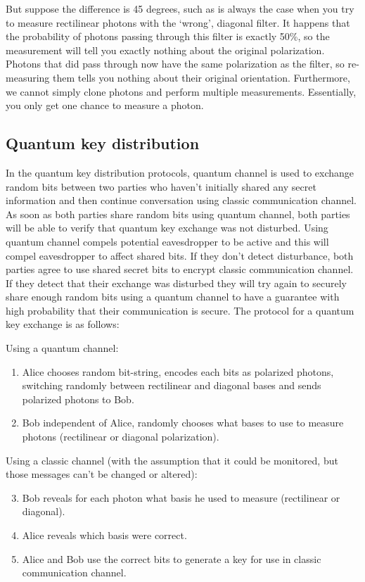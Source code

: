 \documentclass[oneside,a4paper]{article}
\begin{document}
But suppose the difference is 45 degrees, such as is always the case when you try to measure rectilinear photons with the `wrong', diagonal filter. 
It happens that the probability of photons passing through this filter is exactly 50\%, so the measurement will tell you exactly nothing about the original polarization.
Photons that did pass through now have the same polarization as the filter, so re-measuring them tells you nothing about their original orientation.
Furthermore, we cannot simply clone photons and perform multiple measurements.
Essentially, you only get one chance to measure a photon.


\subsection{Quantum key distribution}

In the quantum key distribution protocols, quantum channel is used to exchange random bits between two parties who haven't initially shared any secret information and then continue conversation using classic communication channel. As soon as both parties share random bits using quantum channel, both parties will be able to verify that quantum key exchange was not disturbed. Using quantum channel compels potential eavesdropper to be active and this will compel eavesdropper to affect shared bits. If they don't detect disturbance, both parties agree to use shared secret bits to encrypt classic communication channel. If they detect that their exchange was disturbed they will try again to securely share enough random bits using a quantum channel to have a guarantee with high probability that their communication is secure.
The protocol for a quantum key exchange is as follows:

Using a quantum channel:
\begin{enumerate}
    \item Alice chooses random bit-string, encodes each bits as polarized photons, switching randomly between rectilinear and diagonal bases and sends polarized photons to Bob.
    \item Bob independent of Alice, randomly chooses what bases to use to measure photons (rectilinear or diagonal polarization).
\end{enumerate}

Using a classic channel (with the assumption that it could be monitored, but those messages can't be changed or altered):

\begin{enumerate}
    \setcounter{enumi}{2}
    \item Bob reveals for each photon what basis he used to measure (rectilinear or diagonal).
    \item Alice reveals which basis were correct.
    \item Alice and Bob use the correct bits to generate a key for use in classic communication channel.
\end{enumerate}
\end{document}
